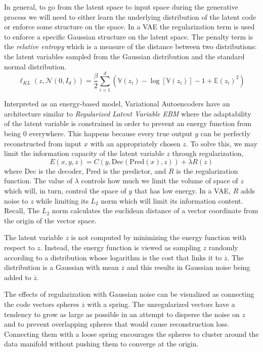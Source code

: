 \documentclass{article}
\begin{document}
In general, to go from the latent space to input space during the generative process we will need to either learn the underlying distribution of the latent code or enforce some structure on the space. In a VAE the regularization term is used to enforce a specific Gaussian structure on the latent space. The penalty term is the \textit{relative entropy} which is a measure of the distance between two distributions: the latent variables sampled from the Gaussian distribution and the standard normal distribution.
\[
    \ell_{KL}(z, \mathcal N(0, I_d)) = 
    \frac{\beta}{2}\sum_{i=1}^{d}(\mathbb{V}(z_i) - \log[\mathbb{V}(z_i)] - 1 + \mathbb{E}(z_i)^2 )
\]

Interpreted as an energy-based model, Variational Autoencoders have an architecture similar to \textit{Regularized Latent Variable EBM} where the adaptability of the latent variable is constrained in order to prevent an energy function from being 0 everywhere. This happens because every true output $y$ can be perfectly reconstructed from input $x$ with an appropriately chosen $z$. To solve this, we may limit the information capacity of the latent variable $z$ through regularization,
\[
    E(x,y,z) = C(y, \text{Dec}(\text{Pred}(x), z)) + \lambda R(z)
\]
where Dec is the decoder, Pred is the predictor, and $R$ is the regularization function. The value of $\lambda$ controls how much we limit the volume of space of $z$ which will, in turn, control the space of $y$ that has low energy. In a VAE, $R$ adds noise to $z$ while limiting its $L_2$ norm which will limit its information content. Recall, The $L_2$ norm calculates the euclidean distance of a vector coordinate from the origin of the vector space.

The latent variable $z$ is not computed by minimizing the energy function with respect to $z$. Instead, the energy function is viewed as sampling $z$ randomly according to a distribution whose logarithm is the cost that links it to $\overline z$. The distribution is a Gaussian with mean $\overline z$ and this results in Gaussian noise being added to $\overline z$.

The effects of regularization with Gaussian noise can be visualized as connecting the code vectors spheres $\overline z$ with a spring. The unregularized vectors have a tendency to grow as large as possible in an attempt to disperse the noise on $z$ and to prevent overlapping spheres that would cause reconstruction loss. Connecting them with a loose spring encourages the spheres to cluster around the data manifold without pushing them to converge at the origin.
\end{document}
